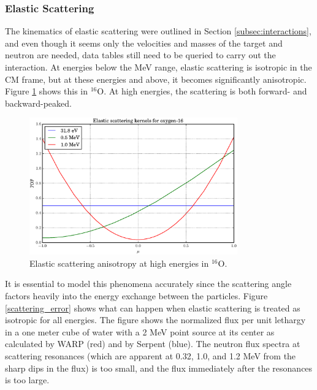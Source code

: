 \subsubsection{Elastic Scattering}

The kinematics of elastic scattering were outlined in Section \ref{subsec:interactions}, and even though it seems only the velocities and masses of the target and neutron are needed, data tables still need to be queried to carry out the interaction.  At energies below the MeV range, elastic scattering is isotropic in the CM frame, but at these energies and above, it becomes significantly anisotropic.  Figure \ref{scattering_anisotropy} shows this in $^{16}$O.  At high energies, the scattering is both forward- and backward-peaked.  

\begin{figure}[h!] 
  \centering
    \includegraphics[width=0.8\textwidth]{graphics/scattering_anisotropy.eps}
     \caption{Elastic scattering anisotropy at high energies in $^{16}$O.  \label{scattering_anisotropy}}
\end{figure}

It is essential to model this phenomena accurately since the scattering angle factors heavily into the energy exchange between the particles.  Figure \ref{scattering_error} shows what can happen when elastic scattering is treated as isotropic for all energies.  The figure shows the normalized flux per unit lethargy in a one meter cube of water with a 2 MeV point source at its center as calculated by WARP (red) and by Serpent (blue).  The neutron flux spectra at scattering resonances (which are apparent at 0.32, 1.0, and 1.2 MeV from the sharp dips in the flux) is too small, and the flux immediately after the resonances is too large.   

